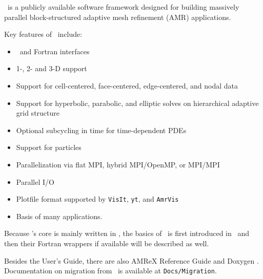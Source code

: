 \amrex\ is a publicly available software framework designed for
building massively parallel block-structured adaptive mesh refinement
(AMR) applications.

Key features of \amrex\ include:
\begin{itemize}
\item \cpp\ and Fortran interfaces
\item 1-, 2- and 3-D support
\item Support for cell-centered, face-centered, edge-centered, and
  nodal data
\item Support for hyperbolic, parabolic, and elliptic solves on
  hierarchical adaptive grid structure
\item Optional subcycling in time for time-dependent PDEs
\item Support for particles
\item Parallelization via flat MPI, hybrid MPI/OpenMP, or MPI/MPI
\item Parallel I/O
\item Plotfile format supported by {\tt VisIt}, {\tt yt}, and {\tt AmrVis}
\item Basis of many applications.
\end{itemize}

Because \amrex's core is mainly written in \cpp, the basics of \amrex\
is first introduced in \cpp\ and then their Fortran wrappers if
available will be described as well.  

Besides the User's Guide, there are also AMReX Reference Guide and
Doxygen \MarginPar{more on this}.  Documentation on migration from
\boxlib\ is available at {\tt Docs/Migration}.
